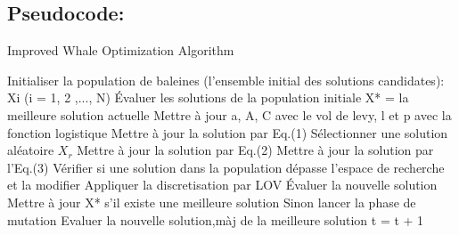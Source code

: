 \documentclass[12pt]{article}
\begin{document}
\subsection{Pseudocode:}
\begin{algorithm}[H]
    \caption{Improved Whale Optimization Algorithm}
    \begin{algorithmic}
        \STATE Initialiser la population de baleines (l'ensemble initial des solutions candidates): Xi (i = 1, 2 ,..., N)\;
        \STATE Évaluer les solutions de la population initiale\;
        \STATE X* = la meilleure solution actuelle\;
                \STATE Mettre à jour a, A, C avec le vol de levy, l et p avec la fonction logistique\;
                        \STATE Mettre à jour la solution par Eq.(1)\;
                    \ELSE
                        \STATE Sélectionner une solution aléatoire \(X_r\)\;
                        \STATE Mettre à jour la solution par Eq.(2)\;
                    \ENDIF
                \ELSE 
                    \STATE Mettre à jour la solution par l'Eq.(3)\;
                \ENDIF
            \ENDFOR
            \STATE Vérifier si une solution dans la population dépasse l'espace de recherche et la modifier\;
            \STATE Appliquer la discretisation par LOV\;
            \STATE Évaluer la nouvelle solution\;
            \STATE Mettre à jour X* s'il existe une meilleure solution Sinon lancer la phase de mutation\;
            \STATE Evaluer la nouvelle solution,màj de la meilleure solution
            \STATE t = t + 1\;
        \ENDWHILE
    \end{algorithmic}
\end{algorithm}
\end{document}
